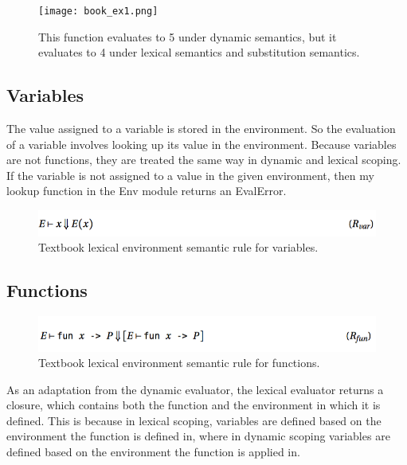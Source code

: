\documentclass{article}
\begin{document}
\begin{figure}[ht]
\begin{center}
\texttt{[image: book\_ex1.png]}
\end{center}
\caption{This function evaluates to 5 under dynamic semantics, but it evaluates to 4 under lexical semantics and substitution semantics.}
\end{figure}

\subsection{Variables}

The value assigned to a variable is stored in the environment. So the evaluation of a variable involves looking up its value in the environment. Because variables are not functions, they are treated the same way in dynamic and lexical scoping. If the variable is not assigned to a value in the given environment, then my lookup function in the Env module returns an EvalError. 

\begin{figure}[ht]
\begin{center}
\includegraphics[width=.7\textwidth]{var_lex.png}
\end{center}
\caption{Textbook lexical environment semantic rule for variables.}
\end{figure}

\subsection{Functions}

\begin{figure}[h]
\begin{center}
\includegraphics[width=.7\textwidth]{fun_lex.png}
\end{center}
\caption{Textbook lexical environment semantic rule for functions.}
\end{figure}

As an adaptation from the dynamic evaluator, the lexical evaluator returns a closure, which contains both the function and the environment in which it is defined. This is because in lexical scoping, variables are defined based on the environment the function is defined in, where in dynamic scoping variables are defined based on the environment the function is applied in.
\end{document}
